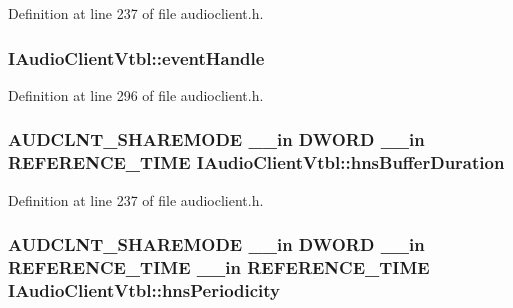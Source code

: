 Definition at line 237 of file audioclient.\+h.

\subsubsection[{\texorpdfstring{event\+Handle}{eventHandle}}]{ I\+Audio\+Client\+Vtbl\+::event\+Handle}\hypertarget{struct_i_audio_client_vtbl_a644805297f63122456dbe678b342bfb8}{}\label{struct_i_audio_client_vtbl_a644805297f63122456dbe678b342bfb8}


Definition at line 296 of file audioclient.\+h.

\subsubsection[{\texorpdfstring{hns\+Buffer\+Duration}{hnsBufferDuration}}]{ {\bf A\+U\+D\+C\+L\+N\+T\+\_\+\+S\+H\+A\+R\+E\+M\+O\+DE} {\bf \+\_\+\+\_\+in} {\bf D\+W\+O\+RD} {\bf \+\_\+\+\_\+in} {\bf R\+E\+F\+E\+R\+E\+N\+C\+E\+\_\+\+T\+I\+ME} I\+Audio\+Client\+Vtbl\+::hns\+Buffer\+Duration}\hypertarget{struct_i_audio_client_vtbl_a890929b32f177c96805c53e446fc075a}{}\label{struct_i_audio_client_vtbl_a890929b32f177c96805c53e446fc075a}


Definition at line 237 of file audioclient.\+h.

\subsubsection[{\texorpdfstring{hns\+Periodicity}{hnsPeriodicity}}]{ {\bf A\+U\+D\+C\+L\+N\+T\+\_\+\+S\+H\+A\+R\+E\+M\+O\+DE} {\bf \+\_\+\+\_\+in} {\bf D\+W\+O\+RD} {\bf \+\_\+\+\_\+in} {\bf R\+E\+F\+E\+R\+E\+N\+C\+E\+\_\+\+T\+I\+ME} {\bf \+\_\+\+\_\+in} {\bf R\+E\+F\+E\+R\+E\+N\+C\+E\+\_\+\+T\+I\+ME} I\+Audio\+Client\+Vtbl\+::hns\+Periodicity}\hypertarget{struct_i_audio_client_vtbl_a2bd94de18e52e2f483ff1588ae1395fb}{}\label{struct_i_audio_client_vtbl_a2bd94de18e52e2f483ff1588ae1395fb}


